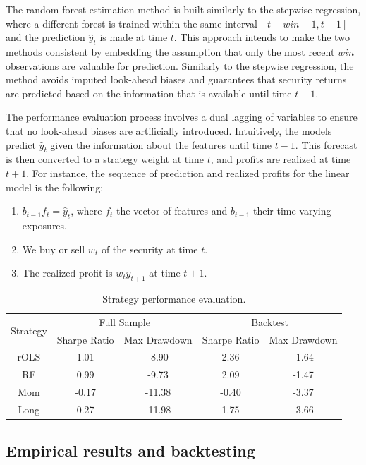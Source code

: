 \documentclass[12pt]{article}
\begin{document}
The random forest estimation method is built similarly to the stepwise regression, where a different forest is trained within the same interval $[t-win-1, t-1]$ and the prediction $\hat y_t$ is made at time $t$. This approach intends to make the two methods consistent by embedding the assumption that only the most recent $win$ observations are valuable for prediction. Similarly to the stepwise regression, the method avoids imputed look-ahead biases and guarantees that security returns are predicted based on the information that is available until time $t-1$.

The performance evaluation process involves a dual lagging of variables to ensure that no look-ahead biases are artificially introduced. Intuitively, the models predict $\hat y_t$ given the information about the features until time $t-1$. This forecast is then converted to a strategy weight at time $t$, and profits are realized at time $t+1$. For instance, the sequence of prediction and realized profits for the linear model is the following:
\begin{enumerate}
	\item $b_{t-1}f_t = \hat y_t$, where $f_t$ the vector of features and $b_{t-1}$ their time-varying exposures.
	\item We buy or sell $w_t$ of the security at time $t$.
	\item The realized profit is $w_ty_{t+1}$ at time $t+1$.
\end{enumerate}

\begin{table}[ht]
\centering\small
\caption{Strategy performance evaluation.}
\label{tab:performance}
\begin{tabular}{ccccc}
\toprule
\multirow{2}{*}{Strategy}		&	\multicolumn{2}{c}{Full Sample} &	\multicolumn{2}{c}{Backtest} \\ %
 &	Sharpe Ratio & Max Drawdown &	Sharpe Ratio & Max Drawdown \\ \midrule
rOLS	&	1.01	&	-8.90		&	2.36	&	-1.64		\\
RF		&	0.99	&	-9.73		&	2.09	&	-1.47		\\
Mom		&	-0.17	&	-11.38	&	-0.40	&	-3.37		\\
Long	&	0.27	&	-11.98	&	1.75	&	-3.66		\\
\bottomrule
\end{tabular}
\end{table}


\subsection{Empirical results and backtesting}
\end{document}
